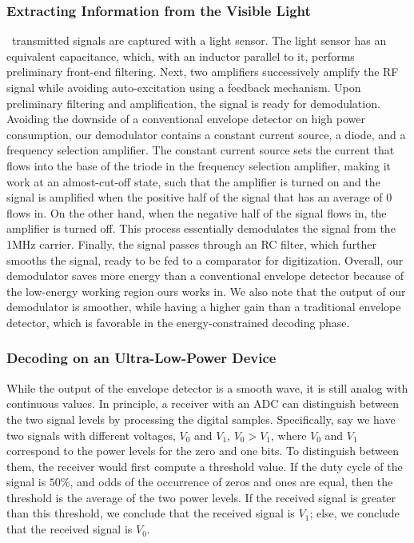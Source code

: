 \subsubsection{Extracting Information from the Visible Light}
\reader\ transmitted signals are captured with a light sensor. The light sensor has an equivalent capacitance, which, with an inductor parallel to it, performs preliminary front-end filtering. Next, two amplifiers successively amplify the RF signal while avoiding auto-excitation using a feedback mechanism. Upon preliminary filtering and amplification, the signal is ready for demodulation. Avoiding the downside of a conventional envelope detector on high power consumption, our demodulator contains a constant current source, a diode, and a frequency selection amplifier. The constant current source sets the current that flows into the base of the triode in the frequency selection amplifier, making it work at an almost-cut-off state, such that the amplifier is turned on and the signal is amplified when the positive half of the signal that has an average of 0 flows in. On the other hand, when the negative half of the signal flows in, the amplifier is turned off. This process essentially demodulates the signal from the 1MHz carrier. Finally, the signal passes through an RC filter, which further smooths the signal, ready to be fed to a comparator for digitization. Overall, our demodulator saves more energy than a conventional envelope detector because of the low-energy working region ours works in. We also note that the output of our demodulator is smoother, while having a higher gain than a traditional envelope detector, which is favorable in the energy-constrained decoding phase.

\subsubsection{Decoding on an Ultra-Low-Power Device}

While the output of the envelope detector is a smooth wave, it is still analog with continuous values. In principle, a receiver with an ADC can distinguish between the two signal levels by processing the digital samples. Specifically, say we have two signals with different voltages, $V_0$ and $V_1$, $V_0 > V_1$, where $V_0$ and $V_1$ correspond to the power levels for the zero and one bits. To distinguish between them, the receiver would first compute a threshold value. If the duty cycle of the signal is $50\%$, and odds of the occurrence of zeros and ones are equal, then the threshold is the average of the two power levels. If the received signal is greater than this threshold, we conclude that the received signal is $V_1$; else, we conclude that the received signal is $V_0$.

